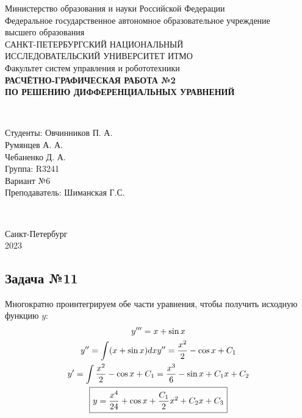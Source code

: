 \documentclass[a3paper,14pt]{extarticle}
\newcommand*\squared[1]{\tikz[baseline=(char.base)]{
            \node[shape=rectangle,draw,inner sep=4pt] (char) {#1};}}
\begin{document}
\begin{titlepage}
    \begin{center}
        Министерство образования и науки Российской Федерации \\
        Федеральное государственное автономное образовательное учреждение \\ высшего образования \\[6pt]
        САНКТ-ПЕТЕРБУРГСКИЙ НАЦИОНАЛЬНЫЙ \\ ИССЛЕДОВАТЕЛЬСКИЙ УНИВЕРСИТЕТ ИТМО \\[16pt]
        Факультет систем управления и робототехники \\[25em]
        \textbf{РАСЧЁТНО-ГРАФИЧЕСКАЯ РАБОТА №2\\ПО РЕШЕНИЮ ДИФФЕРЕНЦИАЛЬНЫХ УРАВНЕНИЙ}
    \end{center}\,\\[12em]
    \begin{flushright}
        Студенты: Овчинников П. А.\\
                  Румянцев А. А.\\
                  Чебаненко Д. А.\\
        Группа: R3241 \\[1em]
        Вариант №6 \\[1em]
        Преподаватель: Шиманская Г.С.
    \end{flushright}\,\\[8.82em]
    \begin{center}
        {\small Санкт-Петербург \\ 2023}
    \end{center}    
\end{titlepage}

\subsection*{\centering Задача №11}
Многократно проинтегрируем обе части уравнения, чтобы получить исходную функцию $y$:
\begin{gather*}
    y'''=x+\sin x\\
    y'' = \int (x +\sin x) dx
    y'' = \frac{x^2}{2} - \cos x + C_1\\
    y' = \int \frac{x^2}{2} - \cos x + C_1 = \frac{x^3}{6} - \sin x + C_1x+C_2\\
    \squared{$y = \dfrac{x^4}{24} + \cos x + \dfrac{C_1}{2}x^2 + C_2x + C_3$}
\end{gather*}
\end{document}
